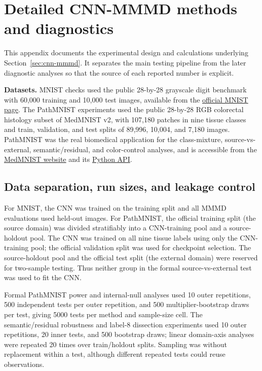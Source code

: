 \documentclass[12pt]{article}
\begin{document}
\clearpage
\section{Detailed CNN-MMMD methods and diagnostics}
\label{app:dechao-cnn-mmmd}
\begingroup
\small
\setlength{\parskip}{0.35ex plus 0.15ex minus 0.1ex}
\setlength{\abovedisplayskip}{3pt}
\setlength{\belowdisplayskip}{3pt}
\setlength{\textfloatsep}{5pt plus 2pt minus 2pt}
\setlength{\intextsep}{5pt plus 2pt minus 2pt}
\captionsetup[figure]{font=small,skip=4pt}
\captionsetup[table]{font=small,skip=4pt}

This appendix documents the experimental design and calculations underlying Section~\ref{sec:cnn-mmmd}. It separates the main testing pipeline from the later diagnostic analyses so that the source of each reported number is explicit.

\noindent\textbf{Datasets.} MNIST checks used the public 28-by-28 grayscale digit benchmark with 60,000 training and 10,000 test images, available from the \href{https://yann.lecun.com/exdb/mnist/}{official MNIST page}. The PathMNIST experiments used the public 28-by-28 RGB colorectal histology subset of MedMNIST v2, with 107,180 patches in nine tissue classes and train, validation, and test splits of 89,996, 10,004, and 7,180 images. PathMNIST was the real biomedical application for the class-mixture, source-vs-external, semantic/residual, and color-control analyses, and is accessible from the \href{https://medmnist.com/}{MedMNIST website} and its \href{https://github.com/MedMNIST/MedMNIST}{Python API}.

\subsection{Data separation, run sizes, and leakage control}

For MNIST, the CNN was trained on the training split and all MMMD evaluations used held-out images. For PathMNIST, the official training split (the source domain) was divided stratifiably into a CNN-training pool and a source-holdout pool. The CNN was trained on all nine tissue labels using only the CNN-training pool; the official validation split was used for checkpoint selection. The source-holdout pool and the official test split (the external domain) were reserved for two-sample testing. Thus neither group in the formal source-vs-external test was used to fit the CNN.

Formal PathMNIST power and internal-null analyses used 10 outer repetitions, 500 independent tests per outer repetition, and 500 multiplier-bootstrap draws per test, giving 5000 tests per method and sample-size cell. The semantic/residual robustness and label-8 dissection experiments used 10 outer repetitions, 20 inner tests, and 500 bootstrap draws; linear domain-axis analyses were repeated 20 times over train/holdout splits. Sampling was without replacement within a test, although different repeated tests could reuse observations.
\end{document}
